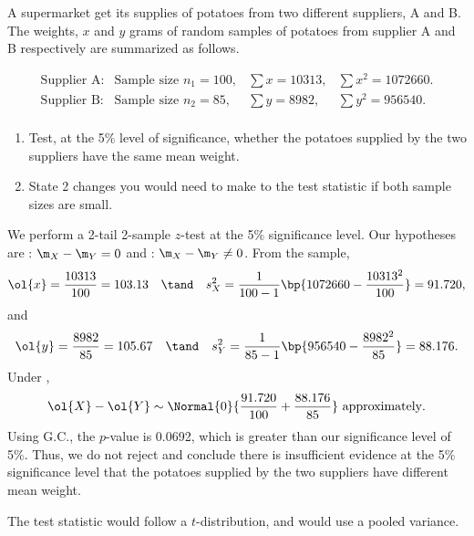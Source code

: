 \begin{problem}
    A supermarket get its supplies of potatoes from two different suppliers, A and B. The weights, $x$ and $y$ grams of random samples of potatoes from supplier A and B respectively are summarized as follows.

    \[\begin{array}{llll}
        \text{Supplier A:} & \text{Sample size } n_1 = 100, & \displaystyle\sum x = 10313, & \displaystyle\sum x^2 = 1072660. \\
        \text{Supplier B:} & \text{Sample size } n_2 = 85, & \displaystyle\sum y = 8982, & \displaystyle\sum y^2 = 956540. \\
        \end{array}\]

    \begin{enumerate}
        \item Test, at the 5\% level of significance, whether the potatoes supplied by the two suppliers have the same mean weight.
        \item State 2 changes you would need to make to the test statistic if both sample sizes are small.
    \end{enumerate}
\end{problem}
\begin{solution}
    \begin{ppart}
        We perform a 2-tail 2-sample $z$-test at the 5\% significance level. Our hypotheses are \nullhyp: $\m_X - \m_Y = 0$ and \althyp: $\m_X - \m_Y \neq 0$. From the sample, \[\ol{x} = \frac{10313}{100} = 103.13 \quad \tand \quad s_X^2 = \frac1{100-1}\bp{1072660 - \frac{10313^2}{100}} = 91.720,\] and \[\ol{y} = \frac{8982}{85} = 105.67 \quad \tand \quad s_Y^2 = \frac1{85-1} \bp{956540 - \frac{8982^2}{85}} = 88.176.\] Under \nullhyp, \[\ol{X} - \ol{Y} \sim \Normal{0}{\frac{91.720}{100} + \frac{88.176}{85}} \text{ approximately}.\] Using G.C., the $p$-value is 0.0692, which is greater than our significance level of 5\%. Thus, we do not reject \nullhyp and conclude there is insufficient evidence at the 5\% significance level that the potatoes supplied by the two suppliers have different mean weight.
    \end{ppart}
    \begin{ppart}
        The test statistic would follow a $t$-distribution, and would use a pooled variance.
    \end{ppart}
\end{solution}